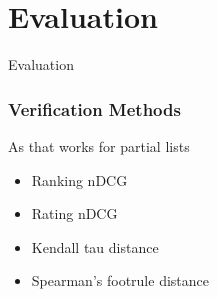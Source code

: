 \section{Evaluation}
\begin{frame}
     \begin{center}
     	\huge Evaluation 
     \end{center}
\end{frame}

\begin{frame}
\frametitle{Verification Methods}
As that works for partial lists
\begin{itemize}
\item Ranking nDCG
\item Rating nDCG
\item Kendall tau distance 
\item Spearman's footrule distance 
\end{itemize}
\end{frame}

